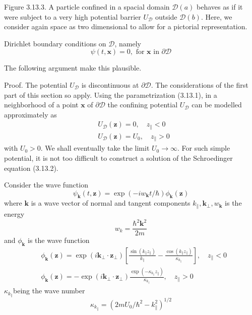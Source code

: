 \documentclass{article}
\begin{document}
Figure 3.13.3. A particle confined in a spacial domain $\mathcal{D}(a)$ behaves as if it were subject to a very high potential barrier $U_{\mathcal{D}}$ outside $\mathcal{D}(b)$. Here, we consider again space as two dimensional to allow for a pictorial representation.

Dirichlet boundary conditions on $\mathcal{D}$, namely
$$
\begin{equation*}
\psi(t, \boldsymbol{x})=0, \text { for } \boldsymbol{x} \text { in } \partial \mathcal{D} \tag{3.13.5}
\end{equation*}
$$

The following argument make this plausible.

Proof. The potential $U_{\mathcal{D}}$ is discontinuous at $\partial \mathcal{D}$. The considerations of the first
part of this section so apply. Using the parametrization (3.13.1), in a neighborhood of a point $\boldsymbol{x}$ of $\partial \mathcal{D}$ the confining potential $U_{\mathcal{D}}$ can be modelled approximately as
$$
\begin{align*}
& U_{\mathcal{D}}(\boldsymbol{z})=0, \quad z_{\|}<0  \tag{3.13.6}\\
& U_{\mathcal{D}}(\boldsymbol{z})=U_{0}, \quad z_{\|}>0
\end{align*}
$$
with $U_{0}>0$. We shall eventually take the limit $U_{0} \rightarrow \infty$. For such simple potential, it is not too difficult to construct a solution of the Schroedinger equation (3.13.2).

Consider the wave function
$$
\begin{equation*}
\psi_{\boldsymbol{k}}(t, \boldsymbol{z})=\exp \left(-i w_{\boldsymbol{k}} t / \hbar\right) \phi_{\boldsymbol{k}}(\boldsymbol{z}) \tag{3.13.7}
\end{equation*}
$$
where $\boldsymbol{k}$ is a wave vector of normal and tangent components $k_{\|}, \boldsymbol{k}_{\perp}, w_{\boldsymbol{k}}$ is the energy
$$
\begin{equation*}
w_{k}=\frac{\hbar^{2} \boldsymbol{k}^{2}}{2 m} \tag{3.13.8}
\end{equation*}
$$
and $\phi_{\boldsymbol{k}}$ is the wave function
$$
\begin{align*}
& \phi_{\boldsymbol{k}}(\boldsymbol{z})=\exp \left(i \boldsymbol{k}_{\perp} \cdot \boldsymbol{z}_{\perp}\right)\left[\frac{\sin \left(k_{\|} z_{\|}\right)}{k_{\|}}-\frac{\cos \left(k_{\|} z_{\|}\right)}{\kappa_{k_{\|}}}\right], \quad z_{\|}<0  \tag{3.13.9}\\
& \phi_{\boldsymbol{k}}(\boldsymbol{z})=-\exp \left(i \boldsymbol{k}_{\perp} \cdot \boldsymbol{z}_{\perp}\right) \frac{\exp \left(-\kappa_{k_{\|}} z_{\|}\right)}{\kappa_{k_{\|}}}, \quad z_{\|}>0
\end{align*}
$$
$\kappa_{k_{\|}}$being the wave number
$$
\begin{equation*}
\kappa_{k_{\|}}=\left(2 m U_{0} / \hbar^{2}-k_{\|}^{2}\right)^{1 / 2} \tag{3.13.10}
\end{equation*}
$$
\end{document}
